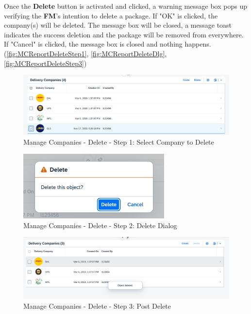 Once the \textbf{Delete} button is activated and clicked, a warning message box pops up verifying the \textbf{FM}'s intention to delete a package. If "OK" is clicked, the company(s) will be deleted. The message box will be closed, a message toast indicates the success deletion and the package will be removed from everywhere. If "Cancel" is clicked, the message box is closed and nothing happens.
(\autoref{fig:MCReportDeleteStep1}, \autoref{fig:MCReportDeleteDlg}, 
\autoref{fig:MCReportDeleteStep3})

\begin{figure}[H]
	\centering
	\includegraphics[width=0.90\linewidth]{images/user_doc/company/report/deleteBtnEnable.png}
	\caption{Manage Companies - Delete - Step 1: Select Company to Delete}
	\label{fig:MCReportDeleteStep1}
\end{figure}

\begin{figure}[H]
	\centering
	\includegraphics[height=100pt]{images/user_doc/company/report/deleteConfirmaton2.png}
	\caption{Manage Companies - Delete - Step 2: Delete Dialog}
	\label{fig:MCReportDeleteDlg}
\end{figure}

\begin{figure}[H]
	\centering
	\includegraphics[width=0.90\linewidth]{images/user_doc/company/report/deleteToast.png}
	\caption{Manage Companies - Delete - Step 3: Post Delete}
	\label{fig:MCReportDeleteStep3}
\end{figure}

